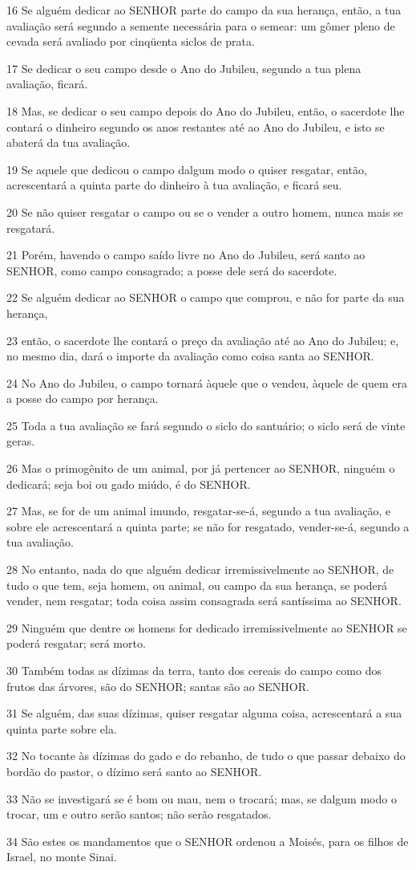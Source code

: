 \par 16 Se alguém dedicar ao SENHOR parte do campo da sua herança, então, a tua avaliação será segundo a semente necessária para o semear: um gômer pleno de cevada será avaliado por cinqüenta siclos de prata.
\par 17 Se dedicar o seu campo desde o Ano do Jubileu, segundo a tua plena avaliação, ficará.
\par 18 Mas, se dedicar o seu campo depois do Ano do Jubileu, então, o sacerdote lhe contará o dinheiro segundo os anos restantes até ao Ano do Jubileu, e isto se abaterá da tua avaliação.
\par 19 Se aquele que dedicou o campo dalgum modo o quiser resgatar, então, acrescentará a quinta parte do dinheiro à tua avaliação, e ficará seu.
\par 20 Se não quiser resgatar o campo ou se o vender a outro homem, nunca mais se resgatará.
\par 21 Porém, havendo o campo saído livre no Ano do Jubileu, será santo ao SENHOR, como campo consagrado; a posse dele será do sacerdote.
\par 22 Se alguém dedicar ao SENHOR o campo que comprou, e não for parte da sua herança,
\par 23 então, o sacerdote lhe contará o preço da avaliação até ao Ano do Jubileu; e, no mesmo dia, dará o importe da avaliação como coisa santa ao SENHOR.
\par 24 No Ano do Jubileu, o campo tornará àquele que o vendeu, àquele de quem era a posse do campo por herança.
\par 25 Toda a tua avaliação se fará segundo o siclo do santuário; o siclo será de vinte geras.
\par 26 Mas o primogênito de um animal, por já pertencer ao SENHOR, ninguém o dedicará; seja boi ou gado miúdo, é do SENHOR.
\par 27 Mas, se for de um animal imundo, resgatar-se-á, segundo a tua avaliação, e sobre ele acrescentará a quinta parte; se não for resgatado, vender-se-á, segundo a tua avaliação.
\par 28 No entanto, nada do que alguém dedicar irremissivelmente ao SENHOR, de tudo o que tem, seja homem, ou animal, ou campo da sua herança, se poderá vender, nem resgatar; toda coisa assim consagrada será santíssima ao SENHOR.
\par 29 Ninguém que dentre os homens for dedicado irremissivelmente ao SENHOR se poderá resgatar; será morto.
\par 30 Também todas as dízimas da terra, tanto dos cereais do campo como dos frutos das árvores, são do SENHOR; santas são ao SENHOR.
\par 31 Se alguém, das suas dízimas, quiser resgatar alguma coisa, acrescentará a sua quinta parte sobre ela.
\par 32 No tocante às dízimas do gado e do rebanho, de tudo o que passar debaixo do bordão do pastor, o dízimo será santo ao SENHOR.
\par 33 Não se investigará se é bom ou mau, nem o trocará; mas, se dalgum modo o trocar, um e outro serão santos; não serão resgatados.
\par 34 São estes os mandamentos que o SENHOR ordenou a Moisés, para os filhos de Israel, no monte Sinai.


